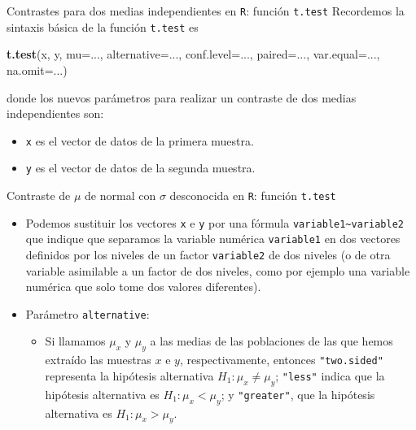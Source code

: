 \documentclass[
  ignorenonframetext,
]{beamer}
\newenvironment{Shaded}{\begin{snugshade}}{\end{snugshade}}
\newcommand{\DataTypeTok}[1]{\textcolor[rgb]{0.13,0.29,0.53}{#1}}
\newcommand{\KeywordTok}[1]{\textcolor[rgb]{0.13,0.29,0.53}{\textbf{#1}}}
\newcommand{\NormalTok}[1]{#1}
\providecommand{\tightlist}{%
  \setlength{\itemsep}{0pt}\setlength{\parskip}{0pt}}
\begin{document}
\begin{frame}[fragile]{Contrastes para dos medias independientes en
\texttt{R}: función \texttt{t.test}}
\protect\hypertarget{contrastes-para-dos-medias-independientes-en-r-funciuxf3n-t.test}{}
Recordemos la sintaxis básica de la función \texttt{t.test} es

\begin{Shaded}
\begin{Highlighting}[]
\KeywordTok{t.test}\NormalTok{(x, y, }\DataTypeTok{mu=}\NormalTok{..., }\DataTypeTok{alternative=}\NormalTok{..., }\DataTypeTok{conf.level=}\NormalTok{..., }\DataTypeTok{paired=}\NormalTok{..., }
       \DataTypeTok{var.equal=}\NormalTok{..., }\DataTypeTok{na.omit=}\NormalTok{...)}
\end{Highlighting}
\end{Shaded}

donde los nuevos parámetros para realizar un contraste de dos medias
independientes son:

\begin{itemize}
\item
  \texttt{x} es el vector de datos de la primera muestra.
\item
  \texttt{y} es el vector de datos de la segunda muestra.
\end{itemize}
\end{frame}

\begin{frame}[fragile]{Contraste de \(\mu\) de normal con \(\sigma\)
desconocida en \texttt{R}: función \texttt{t.test}}
\protect\hypertarget{contraste-de-mu-de-normal-con-sigma-desconocida-en-r-funciuxf3n-t.test}{}
\begin{itemize}
\item
  Podemos sustituir los vectores \texttt{x} e \texttt{y} por una fórmula
  \texttt{variable1\textasciitilde{}variable2} que indique que separamos
  la variable numérica \texttt{variable1} en dos vectores definidos por
  los niveles de un factor \texttt{variable2} de dos niveles (o de otra
  variable asimilable a un factor de dos niveles, como por ejemplo una
  variable numérica que solo tome dos valores diferentes).
\item
  Parámetro \texttt{alternative}:

  \begin{itemize}
  \tightlist
  \item
    Si llamamos \(\mu_x\) y \(\mu_y\) a las medias de las poblaciones de
    las que hemos extraído las muestras \(x\) e \(y\), respectivamente,
    entonces \texttt{"two.sided"} representa la hipótesis alternativa
    \(H_1: \mu_x \neq \mu_y\); \texttt{"less"} indica que la hipótesis
    alternativa es \(H_1: \mu_x< \mu_y\); y \texttt{"greater"}, que la
    hipótesis alternativa es \(H_1: \mu_x> \mu_y\).
  \end{itemize}
\end{itemize}
\end{frame}
\end{document}
